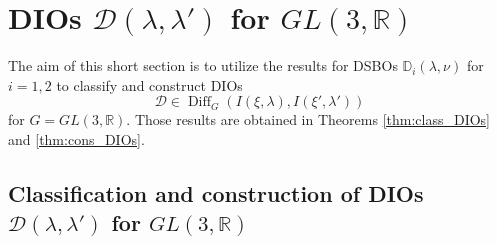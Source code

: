\documentclass[a4paper,11pt,reqno]{amsart}
\newcommand{\DD}{\mathbb{D}}
\newcommand{\RR}{\mathbb{R}}
\newcommand{\calD}{\mathcal{D}}
\newcommand{\0}{{\bf 0}}
\newcommand{\R}{\mathbb{R}}
\newcommand{\1}{{\bf 1}}
\DeclareMathOperator{\Diff}{Diff}
\theoremstyle{plain}
\theoremstyle{definition}
\numberwithin{equation}{section}
\theoremstyle{definition}
\begin{document}
\section{DIOs \texorpdfstring{$\calD(\lambda,\lambda')$}{D(λ,λ')} for \texorpdfstring{$GL(3,\R)$}{GL(3,R)}}
\label{sec:DIO}

The aim of this short section is to utilize the results for DSBOs $\DD_i(\lambda,\nu)$
 for $i=1,2$ to classify and construct DIOs 
 \begin{equation*}
\calD \in \Diff_{G}(I(\xi, \lambda),I(\xi', \lambda'))
\end{equation*}
for $G=GL(3,\RR)$.
Those results are obtained in Theorems \ref{thm:class_DIOs} and 
\ref{thm:cons_DIOs}. 

\subsection{Classification and construction of DIOs
\texorpdfstring{$\calD(\lambda,\lambda')$}{D(λ,λ')} for \texorpdfstring{$GL(3, \R)$}{GL(3,R)}} 
\end{document}
